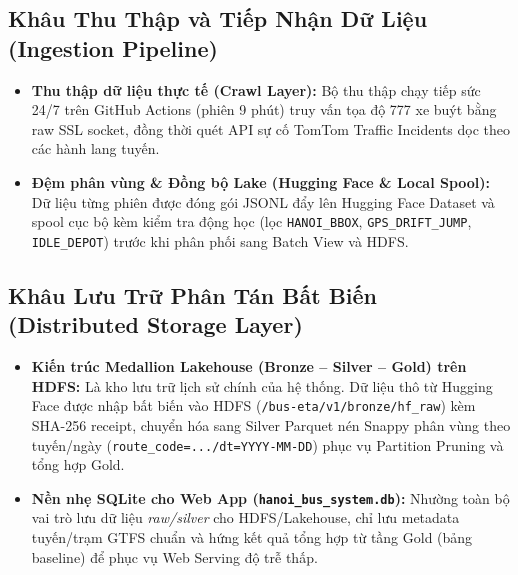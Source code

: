\documentclass[11pt,a4paper]{article}
\begin{document}
\subsection{Khâu Thu Thập và Tiếp Nhận Dữ Liệu (Ingestion Pipeline)}
\begin{itemize}[leftmargin=*,noitemsep,topsep=1.5pt]
    \item \textbf{Thu thập dữ liệu thực tế (Crawl Layer):} Bộ thu thập chạy tiếp sức 24/7 trên GitHub Actions (phiên 9 phút) truy vấn tọa độ 777 xe buýt bằng raw SSL socket, đồng thời quét API sự cố TomTom Traffic Incidents dọc theo các hành lang tuyến.
    \item \textbf{Đệm phân vùng \& Đồng bộ Lake (Hugging Face \& Local Spool):} Dữ liệu từng phiên được đóng gói JSONL đẩy lên Hugging Face Dataset và spool cục bộ kèm kiểm tra động học (lọc \texttt{HANOI\_BBOX}, \texttt{GPS\_DRIFT\_JUMP}, \texttt{IDLE\_DEPOT}) trước khi phân phối sang Batch View và HDFS.
\end{itemize}

\newpage
\subsection{Khâu Lưu Trữ Phân Tán Bất Biến (Distributed Storage Layer)}
\begin{itemize}[leftmargin=*,noitemsep,topsep=1.5pt]
    \item \textbf{Kiến trúc Medallion Lakehouse (Bronze -- Silver -- Gold) trên HDFS:} Là kho lưu trữ lịch sử chính của hệ thống. Dữ liệu thô từ Hugging Face được nhập bất biến vào HDFS (\texttt{/bus-eta/v1/bronze/hf\_raw}) kèm SHA-256 receipt, chuyển hóa sang Silver Parquet nén Snappy phân vùng theo tuyến/ngày (\texttt{route\_code=.../dt=YYYY-MM-DD}) phục vụ Partition Pruning và tổng hợp Gold.
    \item \textbf{Nền nhẹ SQLite cho Web App (\texttt{hanoi\_bus\_system.db}):} Nhường toàn bộ vai trò lưu dữ liệu \textit{raw/silver} cho HDFS/Lakehouse, chỉ lưu metadata tuyến/trạm GTFS chuẩn và hứng kết quả tổng hợp từ tầng Gold (bảng baseline) để phục vụ Web Serving độ trễ thấp.
\end{itemize}
\end{document}
